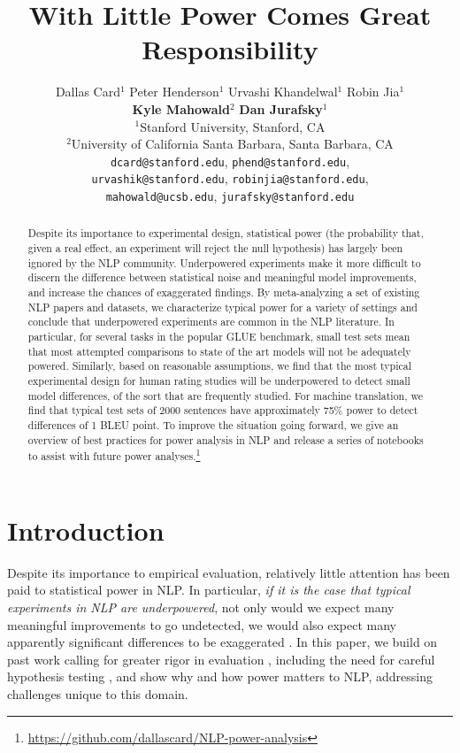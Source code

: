 \documentclass[11pt,a4paper]{article}
\title{With Little Power Comes Great Responsibility}
\author{Dallas Card$^1$ \quad
  Peter Henderson$^1$ \quad
  Urvashi Khandelwal$^1$ \quad
  Robin Jia$^1$  \\
  \textbf{Kyle Mahowald}$^2$ \quad
  \textbf{Dan Jurafsky}$^1$ \\
  $^1$Stanford University, Stanford, CA\\
  $^2$University of California Santa Barbara, Santa Barbara, CA\\
  \texttt{dcard@stanford.edu}, \texttt{phend@stanford.edu}, \\ \texttt{urvashik@stanford.edu}, \texttt{robinjia@stanford.edu}, \\ \texttt{mahowald@ucsb.edu}, \texttt{jurafsky@stanford.edu}}
\date{}
\begin{document}
\maketitle
\begin{abstract}
Despite its importance to experimental design, statistical power (the probability that, given a real effect, an experiment will reject the null hypothesis) has largely been ignored by the NLP community.
Underpowered experiments make it more difficult to discern the difference between statistical noise and meaningful model improvements, and increase the chances of exaggerated findings. 
By meta-analyzing a set of existing NLP papers and datasets, we characterize typical power for a variety of settings and conclude that underpowered experiments are common in the NLP literature.
In particular, for
several tasks in the popular GLUE benchmark, 
small test sets mean that most attempted comparisons to state of the art models will not be adequately powered.
Similarly, based on reasonable assumptions, we find that the most typical experimental design for human rating studies will be  underpowered to detect small model differences, of the sort that are frequently studied.
For machine translation, we find that typical test sets of 2000 sentences have approximately 75\% power
to detect differences of 
1 BLEU point.
To improve the situation going forward, we give an overview of best practices for power analysis in NLP and release a series of notebooks
to assist with future power analyses.\footnote{\href{https://github.com/dallascard/NLP-power-analysis}{https://github.com/dallascard/NLP-power-analysis}}
\end{abstract}

\section{Introduction}

Despite its importance to empirical evaluation, relatively little attention has been paid to statistical power in NLP.
In particular, \emph{if it is the case that typical experiments in NLP are underpowered}, not only would we expect many meaningful improvements to go undetected, we would also expect many apparently significant differences to be exaggerated \citep{gelman2014beyond}.
In this paper, we build on past work calling for greater rigor in evaluation \citep{mccoy2019berts,azer.2020}, including the need for careful hypothesis testing \cite{koehn.2004,berg.2012,sogaard.2014,dror.2018}, 
and show why and how power matters to NLP,
addressing challenges unique to this domain.
\end{document}
